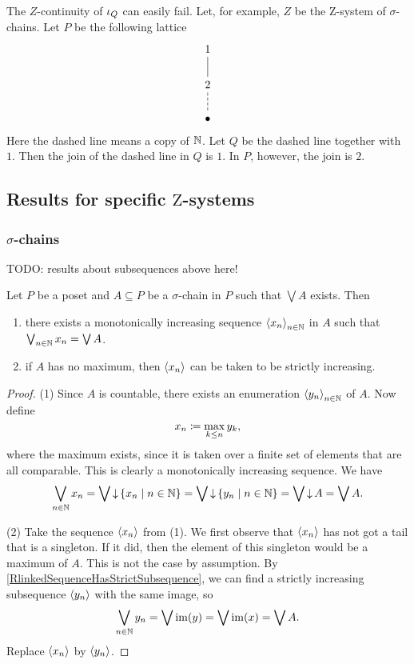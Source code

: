 \begin{example}
The $Z$-continuity of $\operatorname{\iota}_Q$ can easily fail. Let, for example, $Z$ be the $\mathrm{Z}$-system of $\sigma$-chains. Let $P$ be the following lattice
\[ \begin{tikzcd}
1 \ar[d, dash] \\
2 \ar[d, dash, dashed] \\
\bullet
\end{tikzcd} \]
Here the dashed line means a copy of $\mathbb{N}$. Let $Q$ be the dashed line together with $1$. Then the join of the dashed line in $Q$ is $1$. In $P$, however, the join is $2$.
\end{example}


\subsection{Results for specific $\mathrm{Z}$-systems}
\subsubsection{$\sigma$-chains}

TODO: results about subsequences above here!

\begin{lemma} \label{monotoneSequenceLemma}
Let $P$ be a poset and $A\subseteq P$ be a $\sigma$-chain in $P$ such that $\bigvee A$ exists. Then
\begin{enumerate}
\item there exists a monotonically increasing sequence $\left\langle x_n \right\rangle_{n\in \mathbb{N}}$ in $A$ such that $\bigvee_{n\in \mathbb{N}} x_n = \bigvee A$.
\item if $A$ has no maximum, then $\left\langle x_n \right\rangle$ can be taken to be strictly increasing.
\end{enumerate}
\end{lemma}
\begin{proof}
(1) Since $A$ is countable, there exists an enumeration $\left\langle y_n \right\rangle_{n\in \mathbb{N}}$ of $A$. Now define
\[ x_n \coloneqq \max_{k\leq n} y_k, \]
where the maximum exists, since it is taken over a finite set of elements that are all comparable.
This is clearly a monotonically increasing sequence. We have
\[ \bigvee_{n\in \N} x_n = \bigvee \downset \setbuilder{x_n}{n\in \N} = \bigvee \downset \setbuilder{y_n}{n\in \N} = \bigvee \downset A = \bigvee A. \]

(2) Take the sequence $\left\langle x_n \right\rangle$ from (1). We first observe that $\left\langle x_n \right\rangle$ has not got a tail that is a singleton. If it did, then the element of this singleton would be a maximum of $A$. This is not the case by assumption. By \ref{RlinkedSequenceHasStrictSubsequence}, we can find a strictly increasing subsequence $\left\langle y_n \right\rangle$ with the same image, so
\[ \bigvee_{n\in \mathbb{N}}y_n = \bigvee \operatorname{im}(y) = \bigvee \operatorname{im}(x) = \bigvee A. \]
Replace $\left\langle x_n \right\rangle$ by $\left\langle y_n \right\rangle$.
\end{proof}

